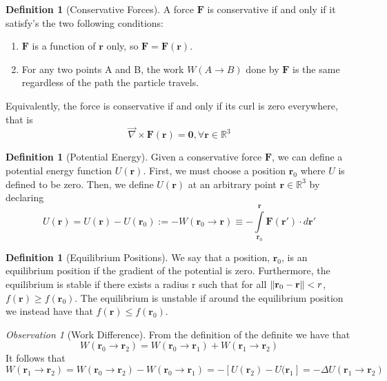 \documentclass[12pt]{article}
\theoremstyle{definition}
\newtheorem{defn}[thm]{Definition}
\theoremstyle{remark}
\newtheorem{obs}[thm]{Observation}
\numberwithin{equation}{section}
\newcommand\R{\mathbb R}    %
\newcommand\B[1]{\textbf{#1}}
\begin{document}
\begin{defn}[Conservative Forces]
        A force $\B{F}$ is conservative if and only if it satisfy's the two following conditions:
        \begin{enumerate}
                \item $\B{F}$ is a function of $\B{r}$ only, so $\B{F} = \B{F}(\B{r})$.
                \item For any two points A and B, the work $W(A\rightarrow B)$ done by $\B{F}$ is the same regardless of the path the particle travels.
        \end{enumerate}
        Equivalently, the force is conservative if and only if its curl is zero everywhere, that is \begin{equation}
                \vec{\nabla}\times\B{F}(\B{r}) = \B{0}, \forall \B{r} \in \R^3
        \end{equation}
\end{defn}

\vspace{15pt}

\begin{defn}[Potential Energy]
        Given a conservative force $\B{F}$, we can define a potential energy function $U(\B{r})$. First, we must choose a position $\B{r}_0$ where $U$ is defined to be zero. Then, we define $U(\B{r})$ at an arbitrary point $\B{r} \in \R^3$ by declaring \begin{equation}
                U(\B{r}) = U(\B{r}) - U(\B{r}_0) := -W(\B{r}_0\rightarrow \B{r}) \equiv -\int\limits_{\B{r}_0}^{\B{r}}\B{F}(\B{r}')\cdot d\B{r}'
        \end{equation}
\end{defn}

\vspace{15pt}

\begin{defn}[Equilibrium Positions]
        We say that a position, $\B{r}_0$, is an equilibrium position if the gradient of the potential is zero. Furthermore, the equilibrium is stable if there exists a radius r such that for all $\norm{\B{r}_0 - \B{r}} < r$, $f(\B{r}) \geq f(\B{r}_0)$. The equilibrium is unstable if around the equilibrium position we instead have that $f(\B{r}) \leq f(\B{r}_0)$.
\end{defn}

\vspace{15pt}

\begin{obs}[Work Difference]
        From the definition of the definite we have that \begin{equation}
                W(\B{r}_0\rightarrow \B{r}_2) = W(\B{r}_0\rightarrow \B{r}_1) + W(\B{r}_1 \rightarrow \B{r}_2)
        \end{equation}
        It follows that \begin{equation}
                W(\B{r}_1 \rightarrow \B{r}_2) = W(\B{r}_0\rightarrow \B{r}_2) - W(\B{r}_0\rightarrow \B{r}_1) = -[U(\B{r}_2) - U(\B{r}_1] = -\Delta U(\B{r}_1\rightarrow \B{r}_2)
        \end{equation}
\end{obs}
\end{document}
